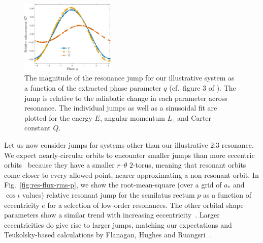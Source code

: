 \documentclass[aps,prd,amsfonts,amssymb,amsmath,nofootinbib,showpacs,superscriptaddress,twocolumn,floatfix]{revtex4-1}
\newcommand{\figref}[1]{Fig.~\ref{fig:#1}}
\newcommand{\sub}[1]{\ensuremath{_\mathrm{#1}}}
\begin{document}
\begin{figure}
\centering
\includegraphics[width=0.4\textwidth]{Fig_q_jump}
\caption{\label{fig:resjump-vs-q}The magnitude of the resonance jump for our illustrative system as a function of the extracted phase parameter $q$ (cf.\ figure 3 of \cite{Flanagan2012a}). The jump is relative to the adiabatic change in each parameter across resonance. The individual jumps as well as a sinusoidal fit are plotted for the energy $E$, angular momentum $L_z$ and Carter constant $Q$.}
\end{figure}


Let us now consider jumps for systems other than our illustrative $2$:$3$ resonance. We expect nearly-circular orbits to encounter smaller jumps than more eccentric orbits~\cite{Flanagan2012} because they have a smaller $r$--$\theta$ $2$-torus, meaning that resonant orbits come closer to every allowed point, nearer approximating a non-resonant orbit. In \figref{res-flux-rms-p}, we show the root-mean-square (over a grid of $a_\ast$ and $\cos\iota$ values) relative resonant jump for the semilatus rectum $p$ as a function of eccentricity $e$ for a selection of low-order resonances. The other orbital shape parameters show a similar trend with increasing eccentricity~\cite{ColeThesis2015}. Larger eccentricities do give rise to larger jumps, matching our expectations and Teukolsky-based calculations by Flanagan, Hughes and Ruangsri~\cite{Flanagan2012a}.
\end{document}
